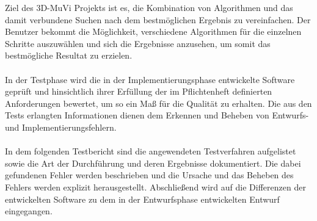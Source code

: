 Ziel des 3D-MuVi Projekts ist es, die Kombination von Algorithmen und das damit verbundene Suchen nach dem bestmöglichen Ergebnis zu vereinfachen. Der Benutzer bekommt die Möglichkeit, verschiedene Algorithmen für die einzelnen Schritte auszuwählen und sich die Ergebnisse anzusehen, um somit das bestmögliche Resultat zu erzielen.
\\\\
In der Testphase wird die in der Implementierungsphase entwickelte Software geprüft und hinsichtlich ihrer Erfüllung der im Pflichtenheft definierten Anforderungen bewertet, um so ein Maß für die Qualität zu erhalten. Die aus den Tests erlangten Informationen dienen dem Erkennen und Beheben von Entwurfs- und Implementierungsfehlern.
\\\\
In dem folgenden Testbericht sind die angewendeten Testverfahren aufgelistet sowie die Art der Durchführung und deren Ergebnisse dokumentiert. Die dabei gefundenen Fehler werden beschrieben und die Ursache und das Beheben des Fehlers werden explizit herausgestellt. Abschließend wird auf die Differenzen der entwickelten Software zu dem in der Entwurfsphase entwickelten Entwurf eingegangen.